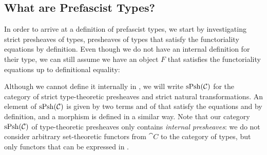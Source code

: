 \subsection{What are Prefascist Types?}

In order to arrive at a definition of prefascist types, we start by 
investigating strict presheaves of types, \ie presheaves of types that satisfy 
the functoriality equations by definition. 
% 
Even though we do not have an internal definition for their type, we can still 
assume we have an object \( F \) that satisfies the functoriality equations up 
to definitional equality:


Although we cannot define it internally in \MLTT, we will write 
\( \mathrm{sPsh}(\mathcal{C}) \) for the category of strict type-theoretic presheaves
and strict natural transformations.
An element of \( \mathrm{sPsh}(\mathcal{C}) \) is given by two terms 
 and  of \MLTT that satisfy the equations  and 
 by definition, and a morphism is defined in a similar way.
Note that our category \( \mathrm{sPsh}(\mathcal{C}) \) of type-theoretic presheaves 
only contains \emph{internal presheaves}: we do not consider arbitrary 
set-theoretic functors from \( \cat{C} \) to the
category of types, but only functors that can be expressed in \MLTT.

